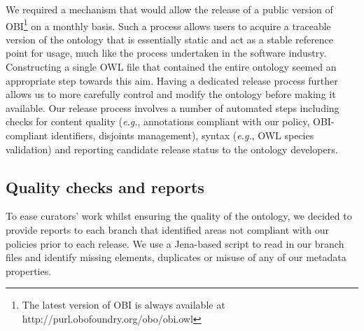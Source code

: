 \documentclass{elsart}       %
\begin{document}
We required a mechanism that would allow the release of a public version of OBI\footnote{The latest version of OBI is always available at http://purl.obofoundry.org/obo/obi.owl} on a monthly basis.
 Such a process allows users to acquire a traceable version of the ontology that is essentially static and act as a stable reference point for usage, much like the process undertaken in the software industry. 
 Constructing a single OWL file that contained the entire ontology seemed an appropriate step towards this aim.
Having a dedicated release process further allows us to more carefully control and modify the ontology before making it available.
Our release process involves a number of automated steps including checks for content quality (\emph{e.g.}, annotations compliant with our policy, OBI-compliant identifiers, disjoints management), syntax (\emph{e.g.}, OWL species validation) and reporting candidate release status to the ontology developers.




\subsection{Quality checks and reports}

To ease curators' work whilst ensuring the quality of the ontology, we decided to provide reports to each branch that identified areas not compliant with our policies prior to each release.
We use a Jena-based\cite{jena} script to read in our branch files and identify missing elements, duplicates or misuse of any of our metadata properties.
\end{document}
